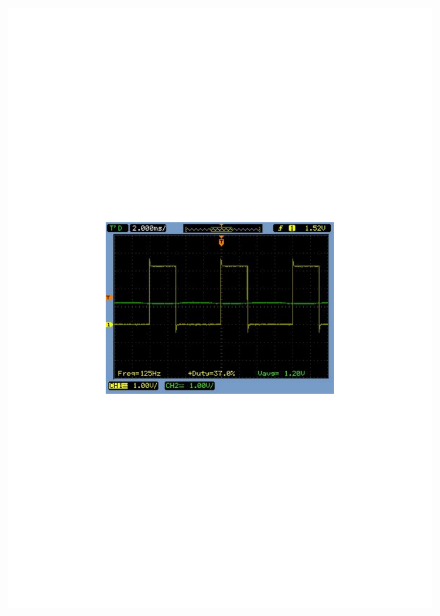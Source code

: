 \begin{figure}[H] \centering
\begin{minipage}[b]{0.48\textwidth} \centering
\includegraphics[width=1.00\textwidth]{filer/modultest/Billeder/SCOP_humidSTUETEMP} %
\end{minipage} \hfill
\begin{minipage}[b]{0.48\textwidth} \centering

\end{minipage}
\end{figure}
